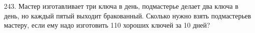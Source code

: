 243. Мастер изготавливает три ключа в день, подмастерье делает два ключа в день, но каждый пятый выходит бракованный. Сколько нужно взять подмастерьев мастеру, если ему надо изготовить 110 хороших ключей за 10 дней?\\
